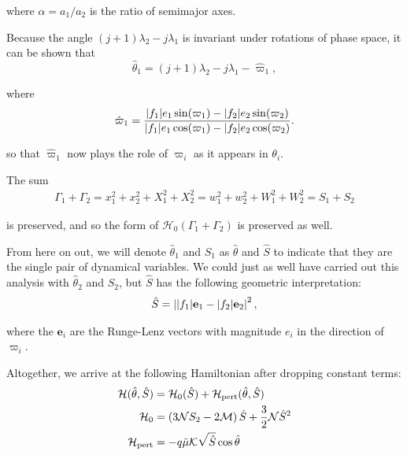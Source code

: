 \documentclass[usenatbib,twocolumn]{mnras}
\DeclarePairedDelimiter{\abs}{|}{|}
\begin{document}
\noindent
where \(\alpha=a_1/a_2\) is the ratio of semimajor axes.

Because the angle \((j+1)\lambda_2-j\lambda_1\) is
invariant under rotations of phase space,
it can be shown that
\begin{equation}
  \hat{\theta}_1 = (j+1)\lambda_2-j\lambda_1
  - \hat\varpi_1,
\end{equation}

\noindent
where
\begin{equation}
\hat\varpi_1 = \frac{\abs{f_1} e_1\sin(\varpi_1) -
  \abs{f_2}e_2\sin(\varpi_2)} {\abs{f_1}e_1\cos(\varpi_1) -
  \abs{f_2}e_2\cos(\varpi_2)}.
\end{equation}

\noindent
so that \(\hat\varpi_1\) now plays the role of \(\varpi_i\) as it appears in \(\theta_i\).

The sum
\begin{align}
  \Gamma_1 +\Gamma_2 = x_1^2+x_2^2 + X_1^2 + X_2^2
  = w_1^2+w_2^2 + W_1^2 + W_2^2 = S_1 + S_2
\end{align}

\noindent
is preserved, and so the form of \(\mathcal H_0(\Gamma_1+\Gamma_2)\)
is preserved as well.

From here on out, we will denote \(\hat\theta_1\) and \(S_1\) as
\(\hat\theta\) and \(\hat S\) to indicate that they are the single pair of
dynamical variables.  We could just as well have carried out this
analysis with \(\hat\theta_2\) and \(S_2\), but \(\hat S\) has the following
geometric interpretation:
\begin{align}
  \hat S = \left\lvert \abs{f_1}\mathbf{e}_1 - \abs{f_2}\mathbf{e}_2\right\rvert^2,
\end{align}

\noindent
where the \(\mathbf{e}_i\) are the Runge-Lenz vectors with magnitude
\(e_i\) in the direction of \(\varpi_i\).  

Altogether, we arrive at the following Hamiltonian after
dropping constant terms:
\begin{align}
  \label{eq:HShat}\mathcal H(\hat \theta, \hat S) &= \mathcal H_0(\hat S) + \mathcal H_{\rm pert}(\hat \theta, \hat S) \\
  \mathcal H_0
  &= \left( 3\mathcal NS_2 -2\mathcal M\right) \hat S
    + \frac32 \mathcal N \hat S^2 \\
  \mathcal H_{\rm pert}
  &= - q\tilde\mu\mathcal K\sqrt{\hat S}\cos\hat\theta
\end{align}
\end{document}
